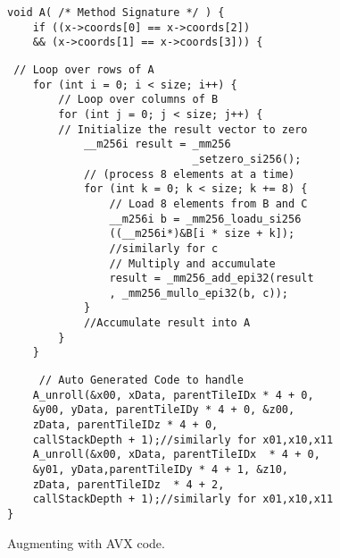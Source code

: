 \begin{figure}[h]
\begin{verbatim}
void A( /* Method Signature */ ) {
    if ((x->coords[0] == x->coords[2]) 
    && (x->coords[1] == x->coords[3])) {   
    \end{verbatim}
    \vspace{-3mm}
\begin{tcolorbox}[colback=white, boxrule=0.5pt, sharp corners,title= Optimized terminating case with AVX.  ]
\begin{verbatim}
 // Loop over rows of A
    for (int i = 0; i < size; i++) {
        // Loop over columns of B
        for (int j = 0; j < size; j++) {
        // Initialize the result vector to zero
            __m256i result = _mm256
                             _setzero_si256();
            // (process 8 elements at a time)
            for (int k = 0; k < size; k += 8) {
                // Load 8 elements from B and C
                __m256i b = _mm256_loadu_si256
                ((__m256i*)&B[i * size + k]);
                //similarly for c
                // Multiply and accumulate
                result = _mm256_add_epi32(result
                , _mm256_mullo_epi32(b, c));
            }
            //Accumulate result into A
        }
    }
    \end{verbatim}
\end{tcolorbox}
\begin{verbatim}   
     // Auto Generated Code to handle
    A_unroll(&x00, xData, parentTileIDx * 4 + 0,
    &y00, yData, parentTileIDy * 4 + 0, &z00, 
    zData, parentTileIDz * 4 + 0,
    callStackDepth + 1);//similarly for x01,x10,x11  
    A_unroll(&x00, xData, parentTileIDx  * 4 + 0,
    &y01, yData,parentTileIDy * 4 + 1, &z10,
    zData, parentTileIDz  * 4 + 2,
    callStackDepth + 1);//similarly for x01,x10,x11
}
\end{verbatim}
 \caption{Augmenting with AVX code.}
    \label{fig:d2p_avx}
\end{figure}


